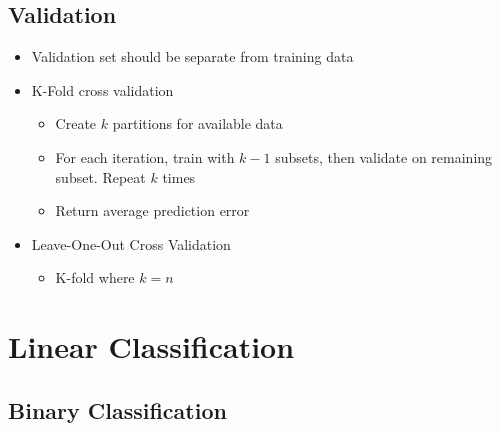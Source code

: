 \documentclass[12pt]{article}
\begin{document}
\subsection{Validation}

\begin{itemize}
	\item Validation set should be separate from training data 
	\item K-Fold cross validation
	\begin{itemize}
		\item Create $k$ partitions for available data 
		\item For each iteration, train with $k - 1$ subsets, then validate on remaining subset. Repeat $k$ times
		\item Return average prediction error
	\end{itemize}
	\item Leave-One-Out Cross Validation
	\begin{itemize}
		\item K-fold where $k = n$
	\end{itemize}
\end{itemize}

\section{Linear Classification}

\subsection{Binary Classification}
\end{document}
